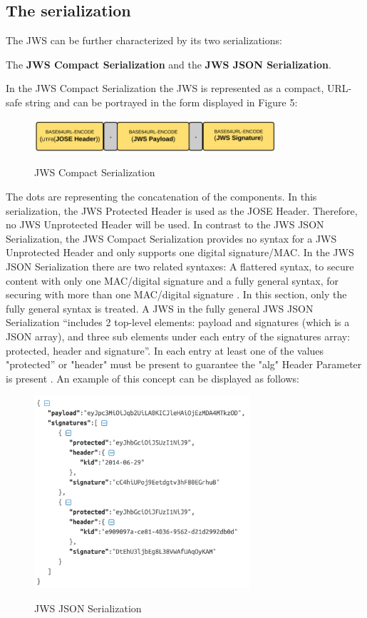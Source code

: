 \subsection{The serialization}
The JWS can be further characterized by its two serializations:\begin{center} The \textbf{JWS Compact Serialization} and the \textbf{JWS JSON Serialization}.\end{center}
In the JWS Compact Serialization the JWS is represented as a compact, URL-safe string \cite{rfc7515} and can be portrayed in the form displayed in Figure 5:
\begin{figure}
\centering
\includegraphics[width=9cm]{Pages/JWS/CompactSerialization.png}
\caption{JWS Compact Serialization}\cite{Compact}
\end{figure}
The dots are representing the concatenation of the components.
In this serialization, the JWS Protected Header is used as the JOSE Header. Therefore, no JWS Unprotected Header will be used.\newline
In contrast to the JWS JSON Serialization, the JWS Compact Serialization provides no syntax for a JWS Unprotected Header and only supports one digital signature/MAC.
In the JWS JSON Serialization there are two related syntaxes: A flattered syntax, to secure content with only one MAC/digital signature and a fully general syntax, for securing with more than one MAC/digital signature \cite{rfc7515}. In this section, only the fully general syntax is treated. 
A JWS in the fully general JWS JSON Serialization ``includes 2 top-level elements: payload and signatures (which is a JSON array), and three sub elements under each entry of the signatures array: protected, header and signature''\cite{Dummies}.
In each entry at least one of the values "protected'' or "header" must be present to guarantee the "alg" Header Parameter is present \cite{rfc7515}.\newline
An example of this concept can be displayed as follows:\newline 
	\begin{figure}
\centering
\includegraphics[width=8cm]{Pages/JWS/JSONSerialization.png}
\caption{JWS JSON Serialization} \cite{JSON}
\end{figure}

